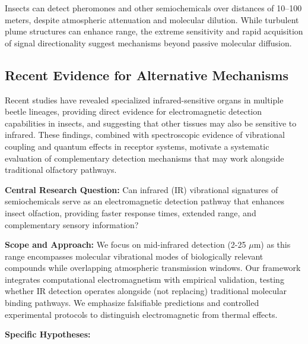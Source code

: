 \documentclass[
  13pt,
  a4paperpaper,
  12pt]{article}
\begin{document}
Insects can detect pheromones and other semiochemicals over distances of
10--100 meters, despite atmospheric attenuation and molecular dilution.
While turbulent plume structures can enhance range, the extreme
sensitivity and rapid acquisition of signal directionality suggest
mechanisms beyond passive molecular diffusion.

\subsection{Recent Evidence for Alternative
Mechanisms}\label{recent-evidence-for-alternative-mechanisms}

Recent studies have revealed specialized infrared-sensitive organs in
multiple beetle lineages, providing direct evidence for electromagnetic
detection capabilities in insects, and suggesting that other tissues may
also be sensitive to infrared. These findings, combined with
spectroscopic evidence of vibrational coupling and quantum effects in
receptor systems, motivate a systematic evaluation of complementary
detection mechanisms that may work alongside traditional olfactory
pathways.

\textbf{Central Research Question:} Can infrared (IR) vibrational
signatures of semiochemicals serve as an electromagnetic detection
pathway that enhances insect olfaction, providing faster response times,
extended range, and complementary sensory information?

\textbf{Scope and Approach:} We focus on mid-infrared detection (2-25
\(\mu\mathrm{m}\)) as this range encompasses molecular vibrational modes
of biologically relevant compounds while overlapping atmospheric
transmission windows. Our framework integrates computational
electromagnetism with empirical validation, testing whether IR detection
operates alongside (not replacing) traditional molecular binding
pathways. We emphasize falsifiable predictions and controlled
experimental protocols to distinguish electromagnetic from thermal
effects.

\textbf{Specific Hypotheses:}
\end{document}
